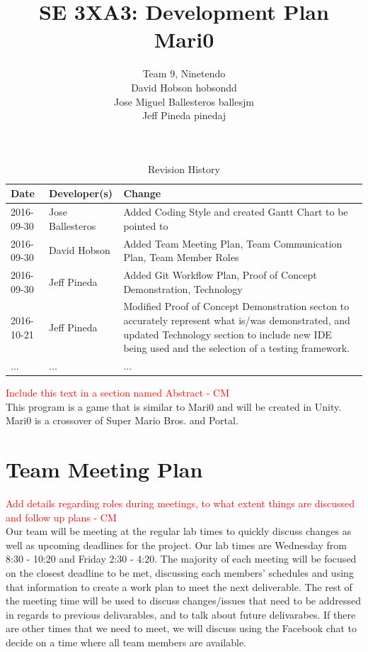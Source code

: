 \documentclass{article}
\title{SE 3XA3: Development Plan\\Mari0}
\author{Team 9, Ninetendo
		\\ David Hobson hobsondd
		\\ Jose Miguel Ballesteros ballesjm
		\\ Jeff Pineda pinedaj
}
\date{}
\begin{document}
\begin{table}[hp]
\caption{Revision History} \label{TblRevisionHistory}
\begin{tabularx}{\textwidth}{llX}
\toprule
\textbf{Date} & \textbf{Developer(s)} & \textbf{Change}\\
\midrule
2016-09-30 & Jose Ballesteros & Added Coding Style and created Gantt Chart to be pointed to\\
2016-09-30 & David Hobson & Added Team Meeting Plan, Team Communication Plan, Team Member Roles\\
2016-09-30 & Jeff Pineda & Added Git Workflow Plan, Proof of Concept Demonstration, Technology\\
2016-10-21 & Jeff Pineda & Modified Proof of Concept Demonstration secton to accurately represent what is/was demonstrated, and updated Technology section to include new IDE being used and the selection of a testing framework.\\
... & ... & ...\\
\bottomrule
\end{tabularx}
\end{table}

\newpage

\maketitle

\textcolor{red}{ Include this text in a section named Abstract - CM} \\
This program is a game that is similar to Mari0 and will be created in Unity. Mari0 is a crossover of Super Mario Bros. and Portal.

\section{Team Meeting Plan}
\textcolor{red}{Add details regarding roles during meetings, to what extent things are discussed and follow up plans - CM} \\
Our team will be meeting at the regular lab times to quickly discuss changes as well as upcoming deadlines for the project. Our lab times are Wednesday from 8:30 - 10:20 and Friday 2:30 - 4:20. The majority of each meeting will be focused on the closest deadline to be met, discussing each members' schedules and using that information to create a work plan to meet the next deliverable. The rest of the meeting time will be used to discuss changes/issues that need to be addressed in regards to previous delivarables, and to talk about future delivarabes. If there are other times that we need to meet, we will discuss using the Facebook chat to decide on a time where all team members are available. 
\end{document}
